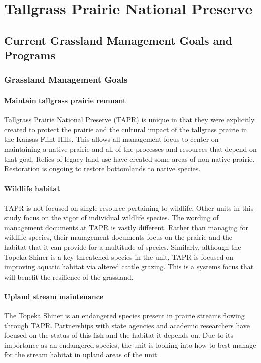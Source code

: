 \section{Tallgrass Prairie National Preserve}\label{app:TAPR}

\subsection{Current Grassland Management Goals and Programs}

\subsubsection{Grassland Management Goals}

\paragraph{Maintain tallgrass prairie remnant} 
Tallgrass Prairie National Preserve (TAPR) is unique in that they were explicitly created to protect the prairie and the cultural impact of the tallgrass prairie in the Kansas Flint Hills. 
This allows all management focus to center on maintaining a native prairie and all of the processes and resources that depend on that goal. 
Relics of legacy land use have created some areas of non-native prairie.
Restoration is ongoing to restore bottomlands to native species.

\paragraph{Wildlife habitat} 
TAPR is not focused on single resource pertaining to wildlife. 
Other units in this study focus on the vigor of individual wildlife species.
The wording of management documents at TAPR is vastly different. 
Rather than managing for wildlife species, their management documents focus on the prairie and the habitat that it can provide for a multitude of species.
Similarly, although the Topeka Shiner is a key threatened species in the unit, TAPR is focused on improving aquatic habitat via altered cattle grazing. 
This is a systems focus that will benefit the resilience of the grassland.

\paragraph{Upland stream maintenance} 
The Topeka Shiner is an endangered species present in prairie streams flowing through TAPR. 
Partnerships with state agencies and academic researchers have focused on the status of this fish and the habitat it depends on. 
Due to its importance as an endangered species, the unit is looking into how to best manage for the stream habitat in upland areas of the unit.


